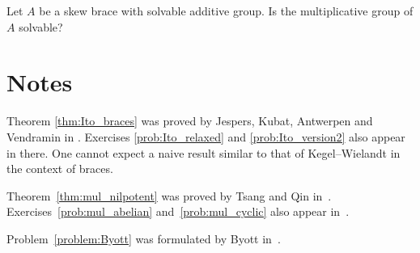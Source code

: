 \begin{problem}
\label{problem:Byott}
    Let $A$ be a skew brace with solvable additive group. Is the 
    multiplicative group of $A$ solvable?
\end{problem}

\section{Notes}

Theorem \ref{thm:Ito_braces} was proved by Jespers, Kubat, Antwerpen and Vendramin in \cite{MR4023387}. 
Exercises \ref{prob:Ito_relaxed} 
and \ref{prob:Ito_version2} 
also appear in there. 
One cannot expect a naive result similar to
that of Kegel--Wielandt in the context of braces. 

Theorem~\ref{thm:mul_nilpotent} was proved by Tsang and Qin in~\cite{MR4077413}. 
Exercises~\ref{prob:mul_abelian} and~\ref{prob:mul_cyclic} also appear in~\cite{MR4077413}.

Problem~\ref{problem:Byott} was formulated by Byott in~\cite{MR3425626}.